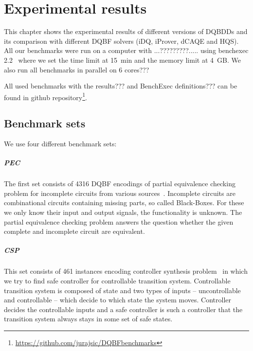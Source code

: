 \documentclass[
  digital, %
  color,
  twoside, %
  table,   %
  nolof,     %
  nolot,     %
]{fithesis3}
\theoremstyle{definition}
\theoremstyle{remark}
\begin{document}

\chapter{Experimental results}
\label{chap:experiments}
This chapter shows the experimental results of different versions of DQBDDs and its comparison with different DQBF solvers (iDQ, iProver, dCAQE and HQS). All our benchmarks were run on a computer with ...?????????..... using benchexec 2.2~\cite{benchexec} where we set the time limit at \SI{15}{min} and the memory limit at \SI{4}{GB}. We also run all benchmarks in parallel on 6 cores???




All used benchmarks with the results??? and BenchExec definitions??? can be found in github repository\footnote{\url{https://github.com/jurajsic/DQBFbenchmarks}}.

\section{Benchmark sets}
We use four different benchmark sets:

\paragraph{PEC}
The first set consists of 4316 DQBF encodings of partial equivalence checking problem for incomplete circuits from various sources~\cite{iDQandDQDIMACS,FastDQBFRefutation,HQSsimpleAlg,PECScholl}. Incomplete circuits are combinational circuits containing missing parts, so called Black-Boxes. For these we only know their input and output signals, the functionality is unknown. The partial equivalence checking problem answers the question whether the given complete and incomplete circuit are equivalent.

\paragraph{CSP}
This set consists of 461 instances encoding controller synthesis problem~\cite{CSPbenchmarks} in which we try to find safe controller for controllable transition system. Controllable transition system is composed of state and two types of inputs -- uncontrollable and controllable -- which decide to which state the system moves. Controller decides the controllable inputs and a safe controller is such a controller that the transition system always stays in some set of safe states.
\end{document}
